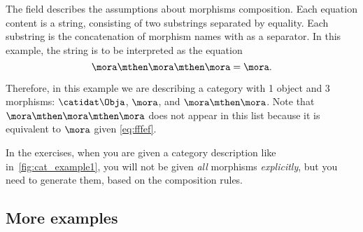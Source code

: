 The field  describes the assumptions about morphisms composition.
Each equation content is a string, consisting of two substrings separated by equality.
Each substring is the concatenation of morphism names with \str{;} as a separator. In this example, the string  is to be interpreted as the equation
\begin{equation}
    \label{eq:fffef}
    \mora \mthen \mora \mthen \mora = \mora.
\end{equation}

Therefore, in this example we are describing a category with 1 object and 3 morphisms: $\catidat\Obja$, $\mora$, and $\mora\mthen\mora$.
Note that $\mora \mthen \mora \mthen \mora$ does not appear in this list because it is equivalent to $\mora$ given \cref{eq:fffef}.

In the exercises, when you are given a category description like in~\cref{fig:cat_example1}, you will not be given \emph{all} morphisms \emph{explicitly}, but you need to generate them, based on the composition rules.

\subsection{More examples}


\seprule


\vfill\pagebreak



\seprule

\seprule
{}

